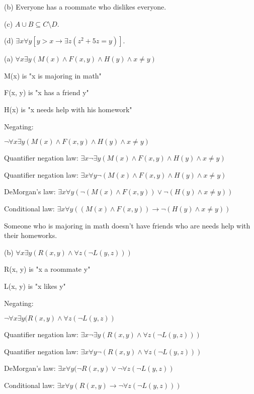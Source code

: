 \documentclass{article}
\begin{document}
\hspace{12pt}(b) Everyone has a roommate who dislikes everyone.

\hspace{12pt}(c) $A \cup B \subseteq C \setminus D$.

\hspace{12pt}(d) $\exists x \forall y [y > x \to \exists z (z^2 + 5z = y)]$.
\vspace{30pt}

(a) $\forall x \exists y (M(x) \land F(x, y) \land H(y) \land x \neq y)$

M(x) is "x is majoring in math"

F(x, y) is "x has a friend y"

H(x) is "x needs help with his homework"

Negating:

$\neg \forall x \exists y (M(x) \land F(x, y) \land H(y) \land x \neq y)$

Quantifier negation law: $\exists x \neg \exists y (M(x) \land F(x, y) \land H(y) \land x \neq y)$

Quantifier negation law: $\exists x \forall y \neg (M(x) \land F(x,y) \land H(y) \land x \neq y)$

DeMorgan's law: $\exists x \forall y (\neg (M(x) \land F(x, y)) \lor \neg (H(y) \land x \neq y))$

Conditional law: $\exists x \forall y ((M(x) \land F(x, y)) \to \neg (H(y) \land x \neq y))$

Someone who is majoring in math doesn't have friends who are needs help with their homeworks.

\vspace{20pt}

(b) $\forall x \exists y (R(x, y) \land \forall z (\neg L(y, z)))$

R(x, y) is "x a roommate y"

L(x, y) is "x likes y"

Negating:

$\neg \forall x \exists y (R(x, y) \land \forall z (\neg L(y, z))$

Quantifier negation law: $\exists x \neg \exists y (R(x, y) \land \forall z (\neg L(y, z)))$

Quantifier negation law: $\exists x \forall y \neg (R(x, y) \land \forall z (\neg L(y, z)))$

DeMorgan's law: $\exists x \forall y (\neg R(x, y) \lor \neg \forall z (\neg L(y, z))$

Conditional law: $\exists x \forall y (R(x, y) \to \neg \forall z (\neg L(y, z)))$
\end{document}
